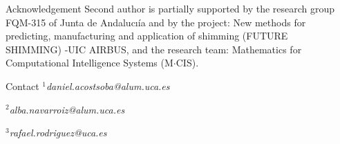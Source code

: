 \documentclass[final]{beamer}
\newlength{\sepmargin}
\newlength{\onecolwid}
\begin{document}
\begin{frame}[t]
\begin{columns}[t]
    \begin{column}{\onecolwid}
      \begin{block}{\large Acknowledgement}
        \vspace*{-0.5cm}
        \footnotesize Second author is partially supported by the research group FQM-315 of Junta de Andalucı\'ia and by the project: New methods for predicting, manufacturing and application of shimming (FUTURE SHIMMING) -UIC AIRBUS, and the research team: Mathematics for Computational Intelligence Systems (M$\cdot$CIS).
      \end{block}
      \vspace*{-0.5cm}

      \begin{block}{\large Contact}
        \vspace*{-0.5cm}
        \footnotesize
        $^1$\emph{daniel.acostsoba@alum.uca.es}

        $^2$\emph{alba.navarroiz@alum.uca.es}

        $^3$\emph{rafael.rodriguez@uca.es}
      \end{block}
    \end{column}

    \begin{column}{\sepmargin}\end{column} %



  \end{columns} %

\end{frame} %
\end{document}
